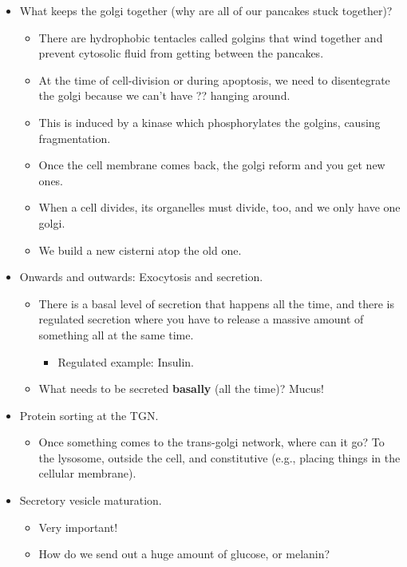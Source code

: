 \documentclass[../notes.tex]{subfiles}
\begin{document}
\begin{itemize}
\begin{itemize}
    \end{itemize}
    \item What keeps the golgi together (why are all of our pancakes stuck together)?
    \begin{itemize}
        \item There are hydrophobic tentacles called golgins that wind together and prevent cytosolic fluid from getting between the pancakes.
        \item At the time of cell-division or during apoptosis, we need to disentegrate the golgi because we can't have ?? hanging around.
        \item This is induced by a kinase which phosphorylates the golgins, causing fragmentation.
        \item Once the cell membrane comes back, the golgi reform and you get new ones.
        \item When a cell divides, its organelles must divide, too, and we only have one golgi.
        \item We build a new cisterni atop the old one.
    \end{itemize}
    \item Onwards and outwards: Exocytosis and secretion.
    \begin{itemize}
        \item There is a basal level of secretion that happens all the time, and there is regulated secretion where you have to release a massive amount of something all at the same time.
        \begin{itemize}
            \item Regulated example: Insulin.
        \end{itemize}
        \item What needs to be secreted \textbf{basally} (all the time)? Mucus!
    \end{itemize}
    \item Protein sorting at the TGN.
    \begin{itemize}
        \item Once something comes to the trans-golgi network, where can it go? To the lysosome, outside the cell, and constitutive (e.g., placing things in the cellular membrane).
    \end{itemize}
    \item Secretory vesicle maturation.
    \begin{itemize}
        \item Very important!
        \item How do we send out a huge amount of glucose, or melanin?

\end{itemize}
\end{itemize}
\end{document}
